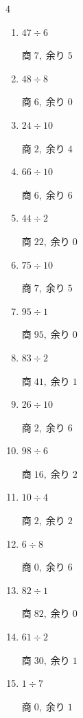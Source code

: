\begin{multicols}{4}
\begin{enumerate}
        $商\; 5,\; 余り\; 0$

  \item $47 \div 6$

        $商\; 7,\; 余り\; 5$

  \item $48 \div 8$

        $商\; 6,\; 余り\; 0$

  \item $24 \div 10$

        $商\; 2,\; 余り\; 4$

  \item $66 \div 10$

        $商\; 6,\; 余り\; 6$

  \item $44 \div 2$

        $商\; 22,\; 余り\; 0$

  \item $75 \div 10$

        $商\; 7,\; 余り\; 5$

  \item $95 \div 1$

        $商\; 95,\; 余り\; 0$

  \item $83 \div 2$

        $商\; 41,\; 余り\; 1$

  \item $26 \div 10$

        $商\; 2,\; 余り\; 6$

  \item $98 \div 6$

        $商\; 16,\; 余り\; 2$

  \item $10 \div 4$

        $商\; 2,\; 余り\; 2$

  \item $6 \div 8$

        $商\; 0,\; 余り\; 6$

  \item $82 \div 1$

        $商\; 82,\; 余り\; 0$

  \item $61 \div 2$

        $商\; 30,\; 余り\; 1$

  \item $1 \div 7$

        $商\; 0,\; 余り\; 1$


\end{enumerate}
\end{multicols}
